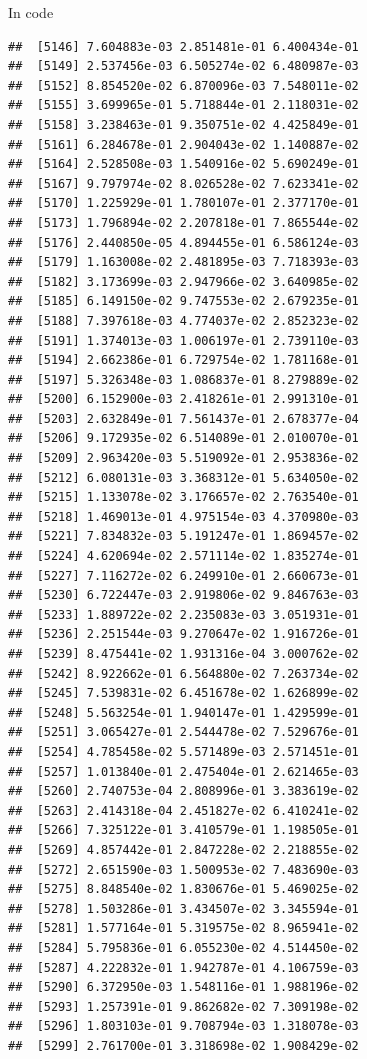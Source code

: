 \documentclass[ignorenonframetext,]{beamer}
\begin{document}
\begin{frame}[fragile]{In code}
\begin{verbatim}
##  [5146] 7.604883e-03 2.851481e-01 6.400434e-01
##  [5149] 2.537456e-03 6.505274e-02 6.480987e-03
##  [5152] 8.854520e-02 6.870096e-03 7.548011e-02
##  [5155] 3.699965e-01 5.718844e-01 2.118031e-02
##  [5158] 3.238463e-01 9.350751e-02 4.425849e-01
##  [5161] 6.284678e-01 2.904043e-02 1.140887e-02
##  [5164] 2.528508e-03 1.540916e-02 5.690249e-01
##  [5167] 9.797974e-02 8.026528e-02 7.623341e-02
##  [5170] 1.225929e-01 1.780107e-01 2.377170e-01
##  [5173] 1.796894e-02 2.207818e-01 7.865544e-02
##  [5176] 2.440850e-05 4.894455e-01 6.586124e-03
##  [5179] 1.163008e-02 2.481895e-03 7.718393e-03
##  [5182] 3.173699e-03 2.947966e-02 3.640985e-02
##  [5185] 6.149150e-02 9.747553e-02 2.679235e-01
##  [5188] 7.397618e-03 4.774037e-02 2.852323e-02
##  [5191] 1.374013e-03 1.006197e-01 2.739110e-03
##  [5194] 2.662386e-01 6.729754e-02 1.781168e-01
##  [5197] 5.326348e-03 1.086837e-01 8.279889e-02
##  [5200] 6.152900e-03 2.418261e-01 2.991310e-01
##  [5203] 2.632849e-01 7.561437e-01 2.678377e-04
##  [5206] 9.172935e-02 6.514089e-01 2.010070e-01
##  [5209] 2.963420e-03 5.519092e-01 2.953836e-02
##  [5212] 6.080131e-03 3.368312e-01 5.634050e-02
##  [5215] 1.133078e-02 3.176657e-02 2.763540e-01
##  [5218] 1.469013e-01 4.975154e-03 4.370980e-03
##  [5221] 7.834832e-03 5.191247e-01 1.869457e-02
##  [5224] 4.620694e-02 2.571114e-02 1.835274e-01
##  [5227] 7.116272e-02 6.249910e-01 2.660673e-01
##  [5230] 6.722447e-03 2.919806e-02 9.846763e-03
##  [5233] 1.889722e-02 2.235083e-03 3.051931e-01
##  [5236] 2.251544e-03 9.270647e-02 1.916726e-01
##  [5239] 8.475441e-02 1.931316e-04 3.000762e-02
##  [5242] 8.922662e-01 6.564880e-02 7.263734e-02
##  [5245] 7.539831e-02 6.451678e-02 1.626899e-02
##  [5248] 5.563254e-01 1.940147e-01 1.429599e-01
##  [5251] 3.065427e-01 2.544478e-02 7.529676e-01
##  [5254] 4.785458e-02 5.571489e-03 2.571451e-01
##  [5257] 1.013840e-01 2.475404e-01 2.621465e-03
##  [5260] 2.740753e-04 2.808996e-01 3.383619e-02
##  [5263] 2.414318e-04 2.451827e-02 6.410241e-02
##  [5266] 7.325122e-01 3.410579e-01 1.198505e-01
##  [5269] 4.857442e-01 2.847228e-02 2.218855e-02
##  [5272] 2.651590e-03 1.500953e-02 7.483690e-03
##  [5275] 8.848540e-02 1.830676e-01 5.469025e-02
##  [5278] 1.503286e-01 3.434507e-02 3.345594e-01
##  [5281] 1.577164e-01 5.319575e-02 8.965941e-02
##  [5284] 5.795836e-01 6.055230e-02 4.514450e-02
##  [5287] 4.222832e-01 1.942787e-01 4.106759e-03
##  [5290] 6.372950e-03 1.548116e-01 1.988196e-02
##  [5293] 1.257391e-01 9.862682e-02 7.309198e-02
##  [5296] 1.803103e-01 9.708794e-03 1.318078e-03
##  [5299] 2.761700e-01 3.318698e-02 1.908429e-02

\end{verbatim}
\end{frame}
\end{document}
